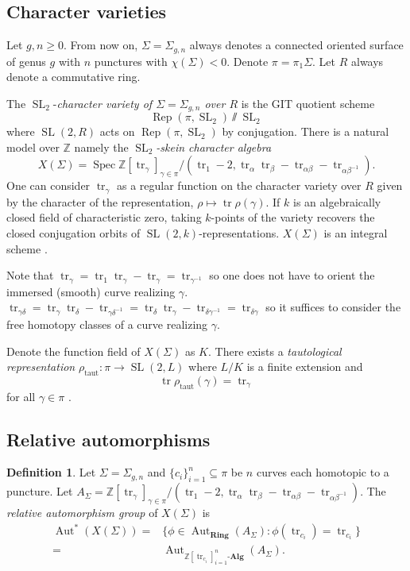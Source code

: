 \documentclass[11pt]{amsart}
\numberwithin{theorem}{section}
\theoremstyle{definition}
\newtheorem{definition}[theorem]{Definition}
\theoremstyle{remark}
\newcommand{\Z}{{\mathbb{Z}}}
\DeclareMathOperator{\Aut}{Aut}
\DeclareMathOperator{\Rep}{Rep}
\DeclareMathOperator{\SL}{SL}
\DeclareMathOperator{\Spec}{Spec}
\DeclareMathOperator{\tr}{tr}
\newcommand{\<}{\langle}
\renewcommand{\>}{\rangle}
\begin{document}
\subsection{Character varieties}

Let $g, n \geq 0$. From now on, $\Sigma = \Sigma_{g,n}$ always denotes a connected oriented surface of genus $g$ with $n$ punctures with $\chi(\Sigma) < 0$.  Denote $\pi = \pi_1 \Sigma$. Let $R$ always denote a commutative ring.

The $\SL_2$-\textit{character variety of $\Sigma = \Sigma_{g,n}$ over $R$} is the GIT quotient scheme
\[
    \Rep(\pi, \SL_2) \sslash \SL_2
\]
where $\SL(2, R)$ acts on $\Rep(\pi, \SL_2)$ by conjugation. There is a natural model over $\Z$ namely the \textit{$\SL_2$-skein character algebra}
\[
X(\Sigma) = \Spec \Z[\tr_\gamma]_{\gamma \in \pi} / (\tr_{1} - 2, \tr_\alpha\tr_\beta - \tr_{\alpha \beta} - \tr_{\alpha \beta^{-1}}).
\]
One can consider $\tr_\gamma$ as a regular function on the character variety over $R$ given by the character of the representation, $\rho \mapsto \tr \rho(\gamma)$. If $k$ is an algebraically closed field of characteristic zero, taking $k$-points of the variety recovers the closed conjugation orbits of $\SL(2, k)$-representations. $X(\Sigma)$ is an integral scheme \cite{przytycki2019skein}.

Note that $\tr_\gamma = \tr_1 \tr_\gamma - \tr_\gamma = \tr_{\gamma^{-1}}$ so one does not have to orient the immersed (smooth) curve realizing $\gamma$. $\tr_{\gamma \delta} = \tr_\gamma \tr_\delta - \tr_{\gamma \delta^{-1}} = \tr_\delta \tr_\gamma - \tr_{\delta \gamma^{-1}} = \tr_{\delta \gamma}$ so it suffices to consider the free homotopy classes of a curve realizing $\gamma$. 

Denote the function field of $X(\Sigma)$ as $K$. There exists a \textit{tautological representation} $\rho_{\text{taut}} : \pi \rightarrow \SL(2, L)$ where $L/K$ is a finite extension and 
\[
    \tr \rho_{\text{taut}}(\gamma) = \tr_{\gamma}
\]
for all $\gamma \in \pi$ \cite{marche2015character}. \ \\

\subsection{Relative automorphisms}

\begin{definition}
    Let $\Sigma = \Sigma_{g, n}$ and $\{c_i\}_{i=1}^n \subseteq \pi$ be $n$ curves each homotopic to a puncture. Let $A_\Sigma =  \Z[\tr_\gamma]_{\gamma \in \pi} / (\tr_{1} - 2, \tr_\alpha\tr_\beta - \tr_{\alpha \beta} - \tr_{\alpha \beta^{-1}})$. The \textit{relative automorphism group} of $X(\Sigma)$ is
    \begin{align*}
        \Aut^*(X(\Sigma)) =& \{ \phi \in \Aut_{\mathbf{Ring}}(A_\Sigma) : \phi(\tr_{c_i}) = \tr_{c_i} \} \\
        =& \Aut_{\Z[\tr_{c_i}]_{i=1}^n\text{-}\mathbf{Alg}}(A_\Sigma).
    \end{align*}
\end{definition}
\end{document}

